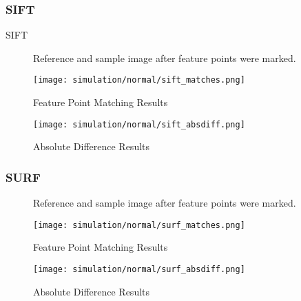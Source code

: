 		\subsubsection{SIFT}
		SIFT 
		\begin{figure}[H]
			\caption{Reference and sample image after feature points were marked.}
			\label{fig:siftFeaturePoints}
		\end{figure}
		\begin{figure}[H]
			\texttt{[image: simulation/normal/sift\_matches.png]}
			\caption{Feature Point Matching Results}
			\label{fig:sifeMatchingResult}
		\end{figure}
		\begin{figure}[H]
			\texttt{[image: simulation/normal/sift\_absdiff.png]}
			\caption{Absolute Difference Results}
			\label{fig:siftAbsDifference}
		\end{figure}


		\subsubsection{SURF}
		\begin{figure}[H]
			\caption{Reference and sample image after feature points were marked.}
			\label{fig:siftFeaturePoints}
		\end{figure}
		\begin{figure}[H]
			\texttt{[image: simulation/normal/surf\_matches.png]}
			\caption{Feature Point Matching Results}
			\label{fig:sifeMatchingResult}
		\end{figure}
		\begin{figure}[H]
			\texttt{[image: simulation/normal/surf\_absdiff.png]}
			\caption{Absolute Difference Results}
			\label{fig:siftAbsDifference}
		\end{figure}


